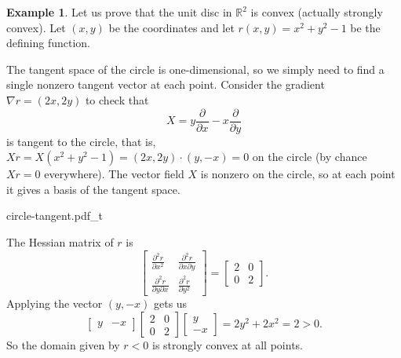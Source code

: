 \documentclass[12pt,openany]{book}
\newcommand{\R}{{\mathbb{R}}}
\theoremstyle{plain}
\theoremstyle{remark}
\theoremstyle{definition}
\newenvironment{myfig}{%
    \begin{center}
}{%
    \end{center}
}
\theoremstyle{exercise}
\theoremstyle{example}
\newtheorem{example}[thm]{Example}
\begin{document}
\begin{example}
Let us prove that the unit disc in $\R^2$ is
convex (actually strongly convex).  Let $(x,y)$ be the coordinates and
let $r(x,y) = x^2+y^2-1$ be the 
defining function.

The tangent space of the circle is one-dimensional, so we simply need to
find a single nonzero tangent vector at each point.
Consider the gradient
%
$\nabla r = (2x,2y)$ to check that
\begin{equation*}
X = y \frac{\partial}{\partial x} - x \frac{\partial}{\partial y}
\end{equation*}
is tangent to the circle, that is,
$Xr = X(x^2+y^2-1) = (2x,2y) \cdot (y,-x) = 0$ on the circle
(by chance $Xr=0$ everywhere).
The vector field $X$ is nonzero on the circle, so at each point it gives a
basis of the tangent space.
\begin{myfig}
{circle-tangent.pdf_t}
\end{myfig}

The Hessian matrix of $r$ is
\begin{equation*}
\begin{bmatrix}
\frac{\partial^2 r}{\partial x^2} &
\frac{\partial^2 r}{\partial x \partial y} \\
\frac{\partial^2 r}{\partial y \partial x} &
\frac{\partial^2 r}{\partial y^2}
\end{bmatrix}
=
\begin{bmatrix}
2 & 0 \\
0 & 2
\end{bmatrix} .
\end{equation*}
Applying the vector $(y,-x)$ gets us
\begin{equation*}
\begin{bmatrix}
y & -x
\end{bmatrix}
\begin{bmatrix}
2 & 0 \\
0 & 2
\end{bmatrix}
\begin{bmatrix}
y \\ -x
\end{bmatrix}
=
2y^2+2x^2 = 2 > 0 .
\end{equation*}
So the domain given by $r < 0$ is strongly convex at all points.
\end{example}
\end{document}
